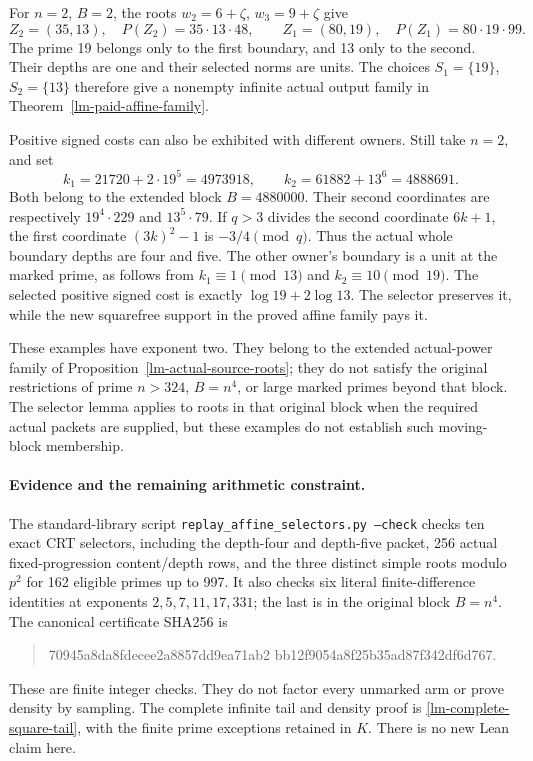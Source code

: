 For \(n=2\), \(B=2\), the roots \(w_2=6+\zeta\),
\(w_3=9+\zeta\) give
\[
 Z_2=(35,13),\quad P(Z_2)=35\cdot13\cdot48,
 \qquad Z_1=(80,19),\quad P(Z_1)=80\cdot19\cdot99.
\]
The prime 19 belongs only to the first boundary, and 13 only to the
second. Their depths are one and their selected norms are units.
The choices \(S_1=\{19\}\), \(S_2=\{13\}\) therefore give a
nonempty infinite actual output family in
Theorem~\ref{lm-paid-affine-family}.

Positive signed costs can also be exhibited with different owners.
Still take \(n=2\), and set
\[
 k_1=21720+2\cdot19^5=4973918,\qquad
 k_2=61882+13^6=4888691.
\]
Both belong to the extended block \(B=4880000\). Their second
coordinates are respectively \(19^4\cdot229\) and
\(13^5\cdot79\). If \(q>3\) divides the second coordinate
\(6k+1\), the first coordinate \((3k)^2-1\) is
\(-3/4\pmod q\). Thus the actual whole boundary depths are
four and five. The other owner's boundary is a unit at the marked
prime, as follows from \(k_1\equiv1\pmod {13}\) and
\(k_2\equiv10\pmod {19}\). The selected positive signed cost
is exactly \(\log19+2\log13\). The selector preserves it, while
the new squarefree support in the proved affine family pays it.

These examples have exponent two. They belong to the extended
actual-power family of Proposition~\ref{lm-actual-source-roots};
they do not satisfy the original restrictions of prime \(n>324\),
\(B=n^4\), or large marked primes beyond that block. The selector
lemma applies to roots in that original block when the required
actual packets are supplied, but these examples do not establish
such moving-block membership.

\paragraph{Evidence and the remaining arithmetic constraint.}
The standard-library script
\texttt{replay\_affine\_\allowbreak selectors.py --check} checks ten exact CRT
selectors, including the depth-four and depth-five packet, 256 actual
fixed-progression content/depth rows, and the three distinct simple
roots modulo \(p^2\) for 162 eligible primes up to 997. It also checks
six literal finite-difference identities at exponents
\(2,5,7,11,17,331\); the last is in the original block \(B=n^4\).
The canonical certificate SHA256 is
\begin{quote}\ttfamily
70945a8da8fdecee\allowbreak 2a8857dd9ea71ab2\allowbreak
bb12f9054a8f25b3\allowbreak 5ad87f342df6d767.
\end{quote}
These are finite integer checks. They do not factor every unmarked
arm or prove density by sampling. The complete infinite tail and
density proof is \eqref{lm-complete-square-tail}, with the finite
prime exceptions retained in \(K\). There is no new Lean claim here.

